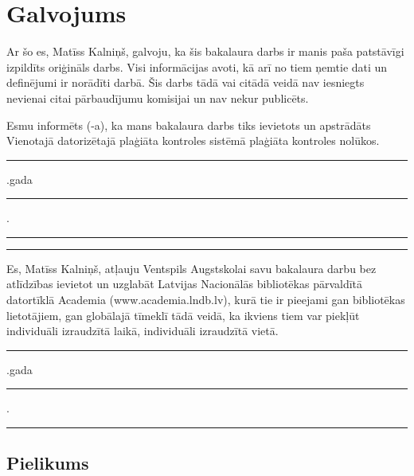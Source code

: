 \documentclass{VEA}
\begin{document}
\renewcommand{\bibname}{\uppercase{Izmantotās literatūras un avotu saraksts}}



\chapter*{Galvojums}
\sloppy
\noindent Ar šo es, Matīss Kalniņš, galvoju, ka šis bakalaura darbs ir manis paša patstāvīgi 
izpildīts oriģināls darbs. Visi informācijas avoti, kā arī no tiem ņemtie dati un
definējumi ir norādīti darbā. Šis darbs tādā vai citādā veidā nav iesniegts nevienai
citai pārbaudījumu komisijai un nav nekur publicēts.

Esmu informēts (-a), ka mans bakalaura darbs tiks ievietots un apstrādāts
Vienotajā datorizētajā plaģiāta kontroles sistēmā plaģiāta kontroles nolūkos.

\vspace{1in}
\rule{0.5cm}{0.2pt}.gada \rule{1cm}{0.2pt}.\rule{3cm}{0.2pt} \tabto{10cm} \rule{5cm}{0.2pt}
\vspace{0.5in}

Es, Matīss Kalniņš, atļauju Ventspils Augstskolai savu bakalaura darbu bez
atlīdzības ievietot un uzglabāt Latvijas Nacionālās bibliotēkas pārvaldītā datortīklā
Academia (www.academia.lndb.lv), kurā tie ir pieejami gan bibliotēkas lietotājiem,
gan globālajā tīmeklī tādā veidā, ka ikviens tiem var piekļūt individuāli izraudzītā
laikā, individuāli izraudzītā vietā.

\vspace{0.5in}
\vspace{0.5in}
\rule{0.5cm}{0.2pt}.gada \rule{1cm}{0.2pt}.\rule{3cm}{0.2pt} 

\label{LastPage}

\begin{appendices}
\chapter*{Pielikums}

\end{appendices}
\end{document}
